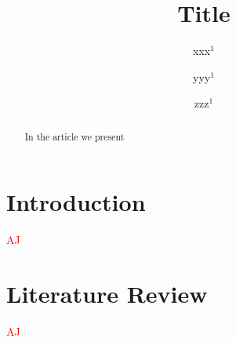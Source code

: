 \documentclass{llncs}
\begin{document}
\title{Title}
\author{xxx$^{1}$
\and yyy$^1$
\and zzz$^{1}$
}


\maketitle

\pagestyle{empty}  %

\begin{abstract}
In the article we present
\end{abstract}



\section{Introduction}
  \label{sec:Introduction}

\textcolor{red} {AJ}








\section{Literature Review}
  \label{sec:Literature Review}
\textcolor{red} {AJ}
\end{document}
